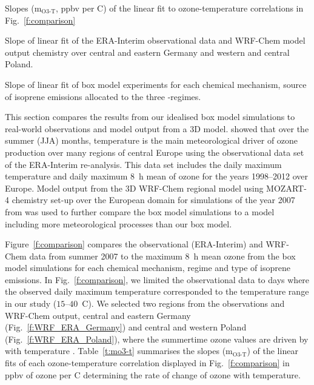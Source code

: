 \begin{table}[t]%
    \centering%
    \caption{Slopes (m$_{\text{O3-T}}$, ppbv per \degree C) of the linear fit to ozone-temperature correlations in Fig.~\ref{f:comparison}}%
    \label{t:mo3-t}%
    \begin{subtable}[t]{\textwidth}%
        \centering%
        \vspace{2mm}%
        \caption{Slope of linear fit of the ERA-Interim observational data and WRF-Chem model output chemistry over central and eastern Germany and western and central Poland.}%
        \label{t:era_wrf_o3-T}%
    \end{subtable}
    \begin{subtable}[t]{\textwidth}%
        \centering%
        \vspace{2mm}
        \caption{Slope of linear fit of box model experiments for each chemical mechanism, source of isoprene emissions allocated to the three -regimes.}%
        \label{t:boxmodel_o3-T}%
    \end{subtable}
    \vspace{-4mm}
\end{table} 

This section compares the results from our idealised box model simulations to real-world observations and model output from a 3D model.
\citet{Otero:2016} showed that over the summer (JJA) months, temperature is the main meteorological driver of ozone production over many regions of central Europe using the observational data set of the ERA-Interim re-analysis.
This data set includes the daily maximum temperature and daily maximum 8~h mean of ozone for the years 1998--2012 over Europe.
Model output from the 3D WRF-Chem regional model using MOZART-4 chemistry set-up over the European domain for simulations of the year 2007 from \citet{Mar:2016} was used to further compare the box model simulations to a model including more meteorological processes than our box model.

Figure~\ref{f:comparison} compares the observational (ERA-Interim) and WRF-Chem data from summer 2007 to the maximum 8~h mean ozone from the box model simulations for each chemical mechanism,  regime and type of isoprene emissions.
In Fig.~\ref{f:comparison}, we limited the observational data to days where the observed daily maximum temperature corresponded to the temperature range in our study ($15$--$40$~\degree C).
We selected two regions from the observations and WRF-Chem output, central and eastern Germany (Fig.~\ref{f:WRF_ERA_Germany}) and central and western Poland (Fig.~\ref{f:WRF_ERA_Poland}), where the summertime ozone values are driven by with temperature \citep{Otero:2016}.
Table~\ref{t:mo3-t} summarises the slopes (m$_{\text{O3-T}}$) of the linear fits of each ozone-temperature correlation displayed in Fig.~\ref{f:comparison} in ppbv of ozone per \degree C determining the rate of change of ozone with temperature.

